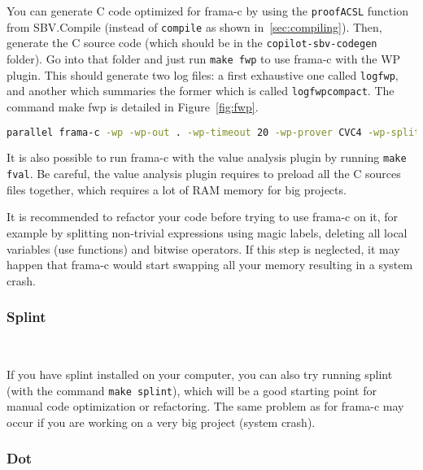 You can generate C code optimized for frama-c by using the \texttt{proofACSL}
function from SBV.Compile (instead of \texttt{compile} as shown
in~\ref{sec:compiling}). Then, generate the C source code (which should be in
the \texttt{copilot-sbv-codegen} folder). Go into that folder and just run
\texttt{make fwp} to use frama-c with the WP plugin. This should generate two
log files: a first exhaustive one called \texttt{logfwp}, and another which
summaries the former which is called \texttt{logfwpcompact}. The command make
fwp is detailed in Figure~\ref{fig:fwp}.

\begin{figure*}[!htb]
	\begin{lstlisting}[frame=none, language=bash]
parallel frama-c -wp -wp-out . -wp-timeout 20 -wp-prover CVC4 -wp-split {} ::: *.c | tee >logfwp >(grep 'Proved\|Unknown\|Timeout\|Failed\|Qed:\s\|CVC4:\s\|Parsing .*\.c' > logfwpcompact) >(grep 'Proved\|Qed:\s\|CVC4:\s\|Unknown\|Timeout\|Failed\|Parsing .*\.c')

	\end{lstlisting}
	\caption{The bash command.}
	\label{fig:fwp}
\end{figure*}

It is also possible to run frama-c with the value analysis plugin by running
\texttt{make fval}. Be careful, the value analysis plugin requires to preload
all the C sources files together, which requires a lot of RAM memory for big
projects.

It is recommended to refactor your code before trying to use frama-c on it, for
example by splitting non-trivial expressions using magic labels, deleting all
local variables (use functions) and bitwise operators. If this step is
neglected, it may happen that frama-c would start swapping all your memory
resulting in a system crash.

\subsubsection{Splint}~\label{subsec:splint}

If you have splint installed on your computer, you can also try running splint
(with the command \texttt{make splint}), which will be a good starting point
for manual code optimization or refactoring. The same problem as for frama-c
may occur if you are working on a very big project (system crash).

\subsubsection{Dot}~\label{subsec:dot}

